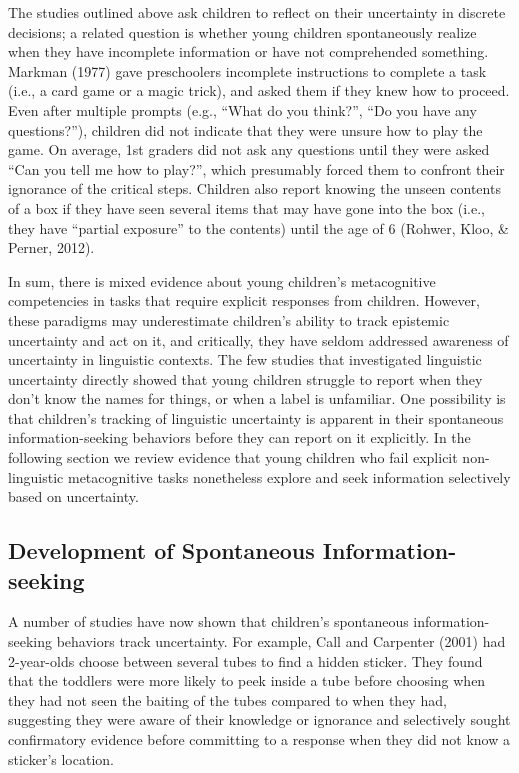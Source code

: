 \documentclass[english,,man]{apa6}
\begin{document}
The studies outlined above ask children to reflect on their uncertainty
in discrete decisions; a related question is whether young children
spontaneously realize when they have incomplete information or have not
comprehended something. Markman (1977) gave preschoolers incomplete
instructions to complete a task (i.e., a card game or a magic trick),
and asked them if they knew how to proceed. Even after multiple prompts
(e.g., \enquote{What do you think?}, \enquote{Do you have any
questions?}), children did not indicate that they were unsure how to
play the game. On average, 1st graders did not ask any questions until
they were asked \enquote{Can you tell me how to play?}, which presumably
forced them to confront their ignorance of the critical steps. Children
also report knowing the unseen contents of a box if they have seen
several items that may have gone into the box (i.e., they have
\enquote{partial exposure} to the contents) until the age of 6 (Rohwer,
Kloo, \& Perner, 2012).

In sum, there is mixed evidence about young children's metacognitive
competencies in tasks that require explicit responses from children.
However, these paradigms may underestimate children's ability to track
epistemic uncertainty and act on it, and critically, they have seldom
addressed awareness of uncertainty in linguistic contexts. The few
studies that investigated linguistic uncertainty directly showed that
young children struggle to report when they don't know the names for
things, or when a label is unfamiliar. One possibility is that
children's tracking of linguistic uncertainty is apparent in their
spontaneous information-seeking behaviors before they can report on it
explicitly. In the following section we review evidence that young
children who fail explicit non-linguistic metacognitive tasks
nonetheless explore and seek information selectively based on
uncertainty.

\subsection{Development of Spontaneous
Information-seeking}\label{development-of-spontaneous-information-seeking}

A number of studies have now shown that children's spontaneous
information-seeking behaviors track uncertainty. For example, Call and
Carpenter (2001) had 2-year-olds choose between several tubes to find a
hidden sticker. They found that the toddlers were more likely to peek
inside a tube before choosing when they had not seen the baiting of the
tubes compared to when they had, suggesting they were aware of their
knowledge or ignorance and selectively sought confirmatory evidence
before committing to a response when they did not know a sticker's
location.
\end{document}
